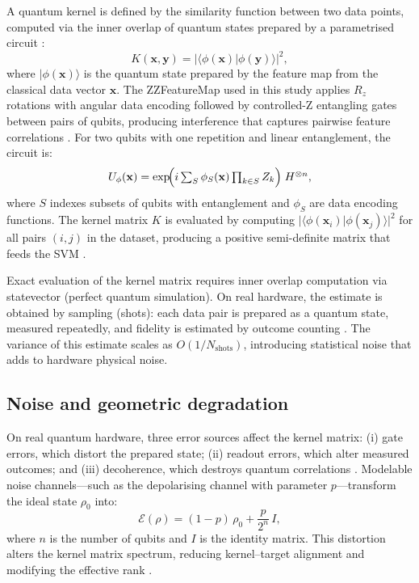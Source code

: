 \documentclass[11pt,a4paper]{article}
\begin{document}
A quantum kernel is defined by the similarity function between two data points,
computed via the inner overlap of quantum states prepared by a parametrised
circuit \citep{kakavand2026benchmarking}:
\begin{equation}
  K(\mathbf{x},\mathbf{y})
  = \bigl|\langle \phi(\mathbf{x}) | \phi(\mathbf{y})\rangle\bigr|^{2},
  \label{eq:kernel}
\end{equation}
where $|\phi(\mathbf{x})\rangle$ is the quantum state prepared by the feature
map from the classical data vector $\mathbf{x}$. The ZZFeatureMap used in this
study applies $R_z$ rotations with angular data encoding followed by
controlled-Z entangling gates between pairs of qubits, producing interference
that captures pairwise feature correlations \citep{havlicek2019supervised}. For
two qubits with one repetition and linear entanglement, the circuit is:
\begin{equation}
  U_{\phi}(\mathbf{x})
  = \exp\!\Bigl(i \textstyle\sum_{S} \phi_{S}(\mathbf{x})
      \prod_{k\in S} Z_{k}\Bigr)\; H^{\otimes n},
  \label{eq:featuremap}
\end{equation}
where $S$ indexes subsets of qubits with entanglement and $\phi_S$ are data
encoding functions. The kernel matrix $K$ is evaluated by computing
$|\langle \phi(\mathbf{x}_i)|\phi(\mathbf{x}_j)\rangle|^{2}$ for all pairs
$(i,j)$ in the dataset, producing a positive semi-definite matrix that feeds
the SVM \citep{havlicek2019supervised,kakavand2026benchmarking}.

Exact evaluation of the kernel matrix requires inner overlap computation via
statevector (perfect quantum simulation). On real hardware, the estimate is
obtained by sampling (shots): each data pair is prepared as a quantum state,
measured repeatedly, and fidelity is estimated by outcome counting
\citep{heyrand2022noisy}. The variance of this estimate scales as
$O(1/N_{\text{shots}})$, introducing statistical noise that adds to
hardware physical noise.

\subsection{Noise and geometric degradation}
\label{ssec:noise}

On real quantum hardware, three error sources affect the kernel matrix: (i)
gate errors, which distort the prepared state; (ii) readout errors, which
alter measured outcomes; and (iii) decoherence, which destroys quantum
correlations \citep{heyrand2022noisy}. Modelable noise channels---such as the
depolarising channel with parameter $p$---transform the ideal state
$\rho_0$ into:
\begin{equation}
  \mathcal{E}(\rho) = (1-p)\,\rho_0 + \frac{p}{2^{n}}\,I,
  \label{eq:depolarise}
\end{equation}
where $n$ is the number of qubits and $I$ is the identity matrix. This
distortion alters the kernel matrix spectrum, reducing kernel--target alignment
and modifying the effective rank \citep{heyrand2022noisy,sahin2025quantum}.
\end{document}

